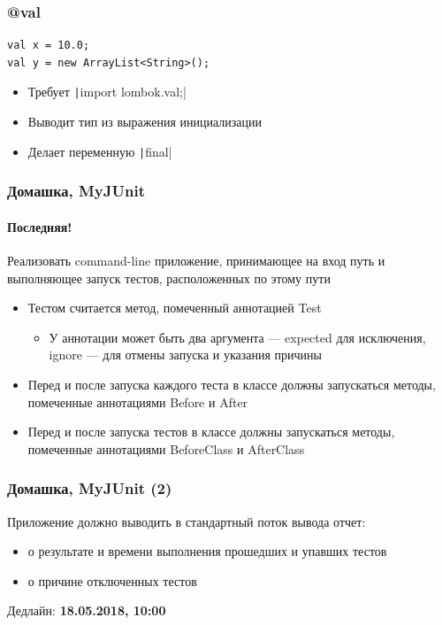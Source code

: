 \documentclass[xetex,mathserif,serif]{beamer}
\begin{document}
	\begin{frame}[fragile]
		\frametitle{@val}
		\begin{verbatim}
val x = 10.0;
val y = new ArrayList<String>();
		\end{verbatim}
		\begin{itemize}
			\item Требует \texttt|import lombok.val;|
			\item Выводит тип из выражения инициализации
			\item Делает переменную \texttt|final|
		\end{itemize}
	\end{frame}

	\begin{frame}
		\frametitle{Домашка, MyJUnit}
		\framesubtitle{Последняя!}
		Реализовать command-line приложение, принимающее на вход путь и выполняющее запуск тестов, расположенных по этому пути
		\begin{itemize}
			\item Тестом считается метод, помеченный аннотацией Test
			\begin{itemize}
				\item У аннотации может быть два аргумента --- expected для исключения, ignore --- для отмены запуска и указания причины
			\end{itemize}
			\item Перед и после запуска каждого теста в классе должны запускаться методы, помеченные аннотациями Before и After
			\item Перед и после запуска тестов в классе должны запускаться методы, помеченные аннотациями BeforeClass и AfterClass
		\end{itemize}
	\end{frame}

	\begin{frame}
		\frametitle{Домашка, MyJUnit (2)}
		Приложение должно выводить в стандартный поток вывода отчет:
		\begin{itemize}
			\item о результате и времени выполнения прошедших и упавших тестов
			\item о причине отключенных тестов
		\end{itemize}
		Дедлайн: \textbf{18.05.2018, 10:00}
	\end{frame}
\end{document}
